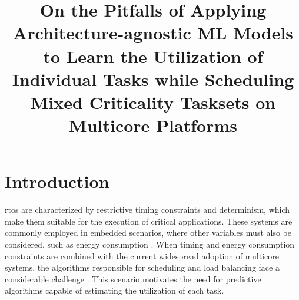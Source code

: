 \documentclass[conference]{IEEEtran}
\begin{document}


\title{On the Pitfalls of Applying Architecture-agnostic ML Models to Learn the Utilization of Individual Tasks while Scheduling Mixed Criticality Tasksets on Multicore Platforms}

\author{%
}

\glsdisablehyper
{}

\maketitle

\IEEEdisplaynontitleabstractindextext
\section{Introduction}

\gls{rtos} are characterized by restrictive timing constraints and determinism, which make them suitable for the execution of critical applications. These systems are commonly employed in embedded scenarios, where other variables must also be considered, such as energy consumption \cite{rahim2025survey}. When timing and energy consumption constraints are combined with the current widespread adoption of multicore systems, the algorithms responsible for scheduling and load balancing face a considerable challenge \cite{gracioli2019designing, horstmann2019framework, lugo2022survey}. This scenario motivates the need for predictive algorithms capable of estimating the utilization of each task.
\end{document}
